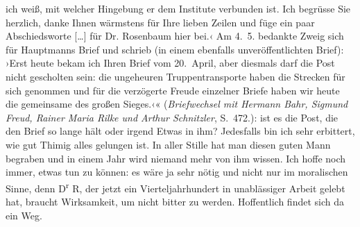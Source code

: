 {{{                     ich weiß, mit welcher Hingebung er dem Institute verbunden ist. Ich begrüsse
                     Sie herzlich, danke Ihnen wärmstens für Ihre lieben Zeilen und füge ein paar
                     Abschiedsworte {[}\ldots{]} für Dr.
                        Rosenbaum hier bei.‹ Am
                        4. 5. bedankte Zweig
                     sich für Hauptmanns Brief und schrieb
                     (in einem ebenfalls unveröffentlichten Brief): ›Erst heute bekam ich Ihren
                     Brief vom 20. April, aber diesmals darf die Post nicht gescholten
                     sein: die ungeheuren Truppentransporte haben die Strecken für sich genommen und
                     für die verzögerte Freude einzelner Briefe haben wir heute die gemeinsame des
                     großen Sieges.‹« (\emph{Briefwechsel mit Hermann Bahr, Sigmund Freud, Rainer Maria
                        Rilke und Arthur Schnitzler}, S. 472.)}}}\label{K_L03654-3}: ist es die
               Post, die den Brief so lange hält oder irgend Etwas in ihm? Jedesfalls bin ich sehr
               erbittert, wie gut Thimig alles gelungen ist.
               In aller Stille hat man diesen guten Mann begraben und in einem Jahr wird niemand mehr von ihm
               wissen. Ich hoffe noch immer, etwas tun zu können: es wäre ja sehr nötig und nicht
               nur im moralischen Sinne, denn D\textsuperscript{r}{ }R, der jetzt ein Vierteljahrhundert in
               unablässiger Arbeit gelebt hat, braucht Wirksamkeit, um nicht bitter zu werden.
               Hoffentlich findet sich da ein Weg.\pend
           
